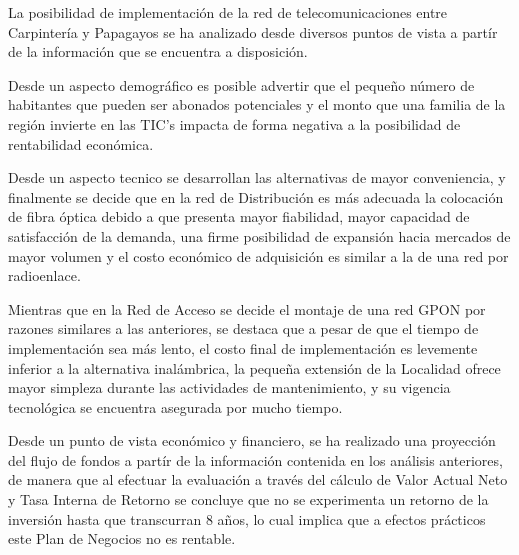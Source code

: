 















La posibilidad de implementación de la red de telecomunicaciones entre Carpintería
y Papagayos se ha analizado desde diversos puntos de vista a partír de la información
que se encuentra a disposición. 

Desde un aspecto demográfico es posible advertir que el pequeño número de habitantes que 
pueden ser abonados potenciales y el monto que una familia de la región
invierte en las TIC's impacta de forma negativa a la posibilidad de rentabilidad
económica. 

Desde un aspecto tecnico se desarrollan las alternativas de mayor conveniencia, y 
finalmente se decide que en la red de Distribución 
es más adecuada la colocación de fibra óptica debido a que presenta mayor
fiabilidad, mayor capacidad de satisfacción de la demanda, una firme posibilidad de expansión
hacia mercados de mayor volumen y el costo económico de adquisición es similar a la de una 
red por radioenlace. 

Mientras que en la Red de Acceso se decide el montaje de una red GPON 
por razones similares a las anteriores, se destaca que a pesar de que el tiempo de
implementación sea más lento, el costo final de implementación
es levemente inferior a la alternativa inalámbrica, la pequeña extensión de la Localidad ofrece
mayor simpleza durante las actividades de mantenimiento, y su vigencia tecnológica se encuentra
asegurada por mucho tiempo.

Desde un punto de vista económico y financiero, se ha realizado una proyección del flujo
de fondos a partír de la información contenida en los análisis anteriores, de manera que
al efectuar la evaluación a través del cálculo de Valor Actual Neto y Tasa Interna de Retorno
se concluye que no se experimenta un retorno de la inversión 
hasta que transcurran 8 años, lo cual implica que a efectos prácticos este Plan de Negocios no
es rentable.
